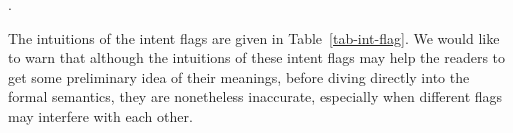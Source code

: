 




\smallskip
{}.

\smallskip

The intuitions of the intent flags are given in Table~\ref{tab-int-flag}. We would like to warn that although the intuitions of these intent flags may help the readers to get some preliminary idea of their meanings, before diving directly into the formal semantics, they are nonetheless inaccurate, especially when different flags may interfere with each other. 

